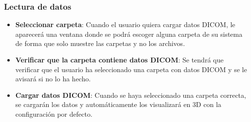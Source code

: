 		\subsubsection{Lectura de datos}
		\begin{itemize}
			\item \textbf{Seleccionar carpeta}: Cuando el usuario quiera cargar datos DICOM, le aparecerá una ventana donde se podrá escoger alguna carpeta de su sistema de forma que solo muestre las carpetas y no los archivos.
			\item \textbf{Verificar que la carpeta contiene datos DICOM}: Se tendrá que verificar que el usuario ha seleccionado una carpeta con datos DICOM y se le avisará si no lo ha hecho.
			\item \textbf{Cargar datos DICOM}: Cuando se haya seleccionado una carpeta correcta, se cargarán los datos y automáticamente los visualizará en 3D con la configuración por defecto.
		\end{itemize}
	
